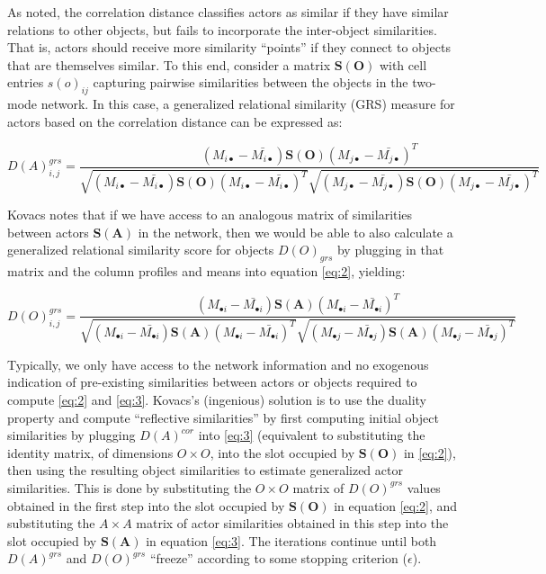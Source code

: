 \documentclass[a4paper,fleqn]{cas-sc}
\begin{document}
As noted, the correlation distance classifies actors as similar if they have similar relations to other objects, but fails to incorporate the inter-object similarities. That is, actors should receive more similarity ``points'' if they connect to objects that are themselves similar. To this end, consider a matrix $\mathbf{S(O)}$ with cell entries $s(o)_{ij}$ capturing pairwise similarities between the objects in the two-mode network. In this case, a generalized relational similarity (GRS) measure for actors based on the correlation distance can be expressed as:

\begin{equation}
    D(A)^{grs}_{i,j} = 
    \frac{
    (M_{i\bullet} - \bar{M_{i\bullet}})
    \mathbf{S(O)}
    (M_{j\bullet} - \bar{M_{j\bullet}})^T
    }
    {
    \sqrt{
    (M_{i\bullet} - \bar{M_{i\bullet}})
    \mathbf{S(O)}
    (M_{i\bullet} - \bar{M_{i\bullet}})^T
    }
    \sqrt{
    (M_{j\bullet} - \bar{M_{j\bullet}})
    \mathbf{S(O)}
    (M_{j\bullet} - \bar{M_{j\bullet}})^T
        }
    }
    \label{eq:2}
\end{equation}

Kovacs notes that if we have access to an analogous matrix of similarities between actors $\mathbf{S(A)}$ in the network, then we would be able to also calculate a generalized relational similarity score for objects $D(O)_{grs}$ by plugging in that matrix and the column profiles and means into equation \ref{eq:2}, yielding:

\begin{equation}
    D(O)^{grs}_{i,j} = 
    \frac{
    (M_{\bullet i} - \bar{M_{\bullet i}})
    \mathbf{S(A)}
    (M_{\bullet i} - \bar{M_{\bullet i}})^T
    }
    {
    \sqrt{
    (M_{\bullet i} - \bar{M_{\bullet i}})
    \mathbf{S(A)}
    (M_{\bullet i} - \bar{M_{\bullet i}})^T
    }
    \sqrt{
    (M_{\bullet j} - \bar{M_{\bullet j}})
    \mathbf{S(A)}
    (M_{\bullet j} - \bar{M_{\bullet j}})^T
        }
    }
    \label{eq:3}
\end{equation}

Typically, we only have access to the network information and no exogenous indication of pre-existing similarities between actors or objects required to compute \ref{eq:2} and \ref{eq:3}. Kovacs's (ingenious) solution is to use the duality property and compute ``reflective similarities'' by first computing initial object similarities by plugging $D(A)^{cor}$ into \ref{eq:3} (equivalent to substituting the identity matrix, of dimensions $O \times O$, into the slot occupied by $\mathbf{S(O)}$ in \ref{eq:2}), then using the resulting object similarities to estimate generalized actor similarities. This is done by substituting the $O \times O$ matrix of $D(O)^{grs}$ values obtained in the first step into the slot occupied by $\mathbf{S(O)}$ in equation \ref{eq:2}, and substituting the $A \times A$ matrix of actor similarities obtained in this step into the slot occupied by $\mathbf{S(A)}$ in equation \ref{eq:3}. The iterations continue until both $D(A)^{grs}$ and $D(O)^{grs}$ ``freeze'' according to some stopping criterion ($\epsilon$). 
\end{document}
